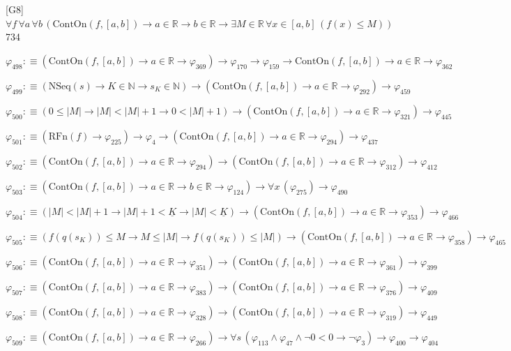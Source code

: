 \begin{fullproof}{[G8]}{$\forall f\,\forall a\,\forall b\,(\mathrm{ContOn}(f,[a,b]) \to a \in \mathbb{R} \to b \in \mathbb{R} \to \exists M \in \mathbb{R}\,\forall x \in [a,b]\,(f(x) \leq M))$}{734}
\begin{abbrevlist}
\item $\varphi_{498} :\equiv (\mathrm{ContOn}(f,[a,b]) \to a \in \mathbb{R} \to \varphi_{369}) \to \varphi_{170} \to \varphi_{159} \to \mathrm{ContOn}(f,[a,b]) \to a \in \mathbb{R} \to \varphi_{362}$
\item $\varphi_{499} :\equiv (\mathrm{NSeq}(s) \to K \in \mathbb{N} \to s_{K} \in \mathbb{N}) \to (\mathrm{ContOn}(f,[a,b]) \to a \in \mathbb{R} \to \varphi_{292}) \to \varphi_{459}$
\item $\varphi_{500} :\equiv (0 \leq \lvert M \rvert \to \lvert M \rvert < \lvert M \rvert + 1 \to 0 < \lvert M \rvert + 1) \to (\mathrm{ContOn}(f,[a,b]) \to a \in \mathbb{R} \to \varphi_{321}) \to \varphi_{445}$
\item $\varphi_{501} :\equiv (\mathrm{RFn}(f) \to \varphi_{225}) \to \varphi_{4} \to (\mathrm{ContOn}(f,[a,b]) \to a \in \mathbb{R} \to \varphi_{294}) \to \varphi_{437}$
\item $\varphi_{502} :\equiv (\mathrm{ContOn}(f,[a,b]) \to a \in \mathbb{R} \to \varphi_{294}) \to (\mathrm{ContOn}(f,[a,b]) \to a \in \mathbb{R} \to \varphi_{312}) \to \varphi_{412}$
\item $\varphi_{503} :\equiv (\mathrm{ContOn}(f,[a,b]) \to a \in \mathbb{R} \to b \in \mathbb{R} \to \varphi_{124}) \to \forall x\,(\varphi_{275}) \to \varphi_{490}$
\item $\varphi_{504} :\equiv (\lvert M \rvert < \lvert M \rvert + 1 \to \lvert M \rvert + 1 < \underline{K} \to \lvert M \rvert < \underline{K}) \to (\mathrm{ContOn}(f,[a,b]) \to a \in \mathbb{R} \to \varphi_{353}) \to \varphi_{466}$
\item $\varphi_{505} :\equiv (f(q(s_{K})) \leq M \to M \leq \lvert M \rvert \to f(q(s_{K})) \leq \lvert M \rvert) \to (\mathrm{ContOn}(f,[a,b]) \to a \in \mathbb{R} \to \varphi_{358}) \to \varphi_{465}$
\item $\varphi_{506} :\equiv (\mathrm{ContOn}(f,[a,b]) \to a \in \mathbb{R} \to \varphi_{351}) \to (\mathrm{ContOn}(f,[a,b]) \to a \in \mathbb{R} \to \varphi_{361}) \to \varphi_{399}$
\item $\varphi_{507} :\equiv (\mathrm{ContOn}(f,[a,b]) \to a \in \mathbb{R} \to \varphi_{383}) \to (\mathrm{ContOn}(f,[a,b]) \to a \in \mathbb{R} \to \varphi_{376}) \to \varphi_{409}$
\item $\varphi_{508} :\equiv (\mathrm{ContOn}(f,[a,b]) \to a \in \mathbb{R} \to \varphi_{328}) \to (\mathrm{ContOn}(f,[a,b]) \to a \in \mathbb{R} \to \varphi_{319}) \to \varphi_{449}$
\item $\varphi_{509} :\equiv (\mathrm{ContOn}(f,[a,b]) \to a \in \mathbb{R} \to \varphi_{266}) \to \forall s\,(\varphi_{113} \land \varphi_{47} \land \neg 0 < 0 \to \neg \varphi_{3}) \to \varphi_{400} \to \varphi_{404}$

\end{abbrevlist}
\end{fullproof}
